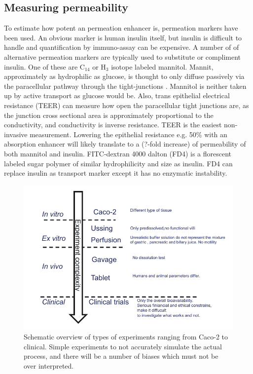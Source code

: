 \subsection{Measuring permeability}
To estimate how potent an permeation enhancer is, permeation markers have been used. An obvious marker is human insulin itself, but insulin is difficult to handle and quantification by immuno-assay can be expensive. A number of of alternative permeation markers are typically used to substitute or compliment insulin. One of these are C$_14$ or H$_3$ isotope labeled mannitol. Mannit, approximately as hydrophilic as glucose, is thought to only diffuse passively via the paracellular pathway through the tight-junctions \cite{anderberg1992epithelial,artursson1994effect}. Mannitol is neither taken up by active transport as glucose would be. Also, trans epithelial electrical resistance (TEER) can measure how open the paracellular tight junctions are, as the junction cross sectional area is approximately proportional to the conductivity, and conductivity is inverse resistance. TEER is the easiest non-invasive measurement. Lowering the epithelial resistance e.g. 50\% with an absorption enhancer will likely translate to a (?-fold increase) of permeability of both mannitol and insulin. FITC-dextran 4000 dalton (FD4) is a florescent labeled sugar polymer of similar hydrophilicity and size as insulin. FD4 can replace insulin as transport marker except it has no enzymatic instability.

\begin{figure}[ht]
\label{devel_typeOf}
\includegraphics{graphics/typeOfExperiments.pdf}
\caption{Schematic overview of types of experiments ranging from Caco-2 to clinical. Simple experiments to not accurately simulate the actual process, and there will be a number of biases which must not be over interpreted.}
\end{figure}


